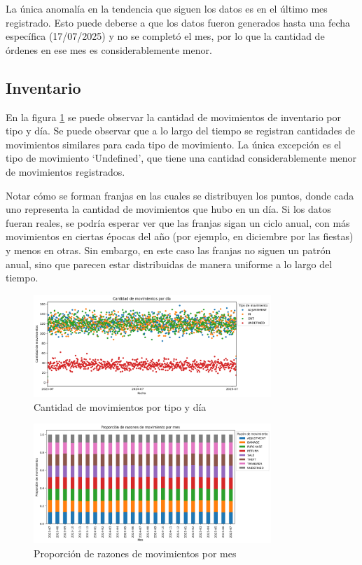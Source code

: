 La única anomalía en la tendencia que siguen los datos es en el último mes registrado. Esto puede deberse a que los datos fueron generados hasta una fecha específica (17/07/2025) y no se completó el mes, por lo que la cantidad de órdenes en ese mes es considerablemente menor.

\subsection{Inventario}

En la figura \ref{fig:movimientos_por_tipo_y_dia} se puede observar la cantidad de movimientos de inventario por tipo y día. Se puede observar que a lo largo del tiempo se registran cantidades de movimientos similares para cada tipo de movimiento. La única excepción es el tipo de movimiento `Undefined', que tiene una cantidad considerablemente menor de movimientos registrados.

Notar cómo se forman franjas en las cuales se distribuyen los puntos, donde cada uno representa la cantidad de movimientos que hubo en un día. Si los datos fueran reales, se podría esperar ver que las franjas sigan un ciclo anual, con más movimientos en ciertas épocas del año (por ejemplo, en diciembre por las fiestas) y menos en otras. Sin embargo, en este caso las franjas no siguen un patrón anual, sino que parecen estar distribuidas de manera uniforme a lo largo del tiempo.

\begin{figure}[H]
    \centering
    \includegraphics[width=0.8\textwidth]{imagenes/datos_uniformes/movimientos_por_tipo_y_dia.png}
    \caption{Cantidad de movimientos por tipo y día}
    \label{fig:movimientos_por_tipo_y_dia}
\end{figure}

\begin{figure}[H]
    \centering
    \includegraphics[width=0.8\textwidth]{imagenes/datos_uniformes/razones_de_movimientos.png}
    \caption{Proporción de razones de movimientos por mes}
    \label{fig:razones_de_movimientos}
\end{figure}


